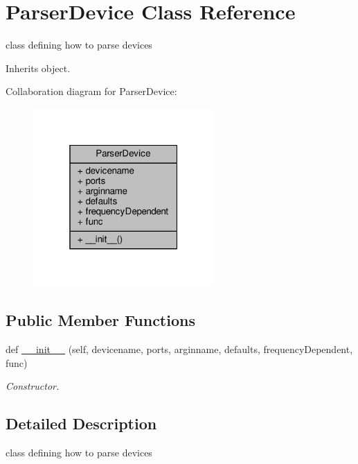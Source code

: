 \hypertarget{classSignalIntegrity_1_1Parsers_1_1Devices_1_1DeviceParser_1_1ParserDevice}{}\section{Parser\+Device Class Reference}
\label{classSignalIntegrity_1_1Parsers_1_1Devices_1_1DeviceParser_1_1ParserDevice}


class defining how to parse devices  




Inherits object.



Collaboration diagram for Parser\+Device\+:\nopagebreak
\begin{figure}[H]
\begin{center}
\leavevmode
\includegraphics[width=196pt]{classSignalIntegrity_1_1Parsers_1_1Devices_1_1DeviceParser_1_1ParserDevice__coll__graph}
\end{center}
\end{figure}
\subsection*{Public Member Functions}
\begin{DoxyCompactItemize}
\item 
def \hyperlink{classSignalIntegrity_1_1Parsers_1_1Devices_1_1DeviceParser_1_1ParserDevice_ac11c3f53e8e6927c672d9f9f0aa5b933}{\+\_\+\+\_\+init\+\_\+\+\_\+} (self, devicename, ports, arginname, defaults, frequency\+Dependent, func)
\begin{DoxyCompactList}\small\item\em Constructor. \end{DoxyCompactList}\end{DoxyCompactItemize}


\subsection{Detailed Description}
class defining how to parse devices 

